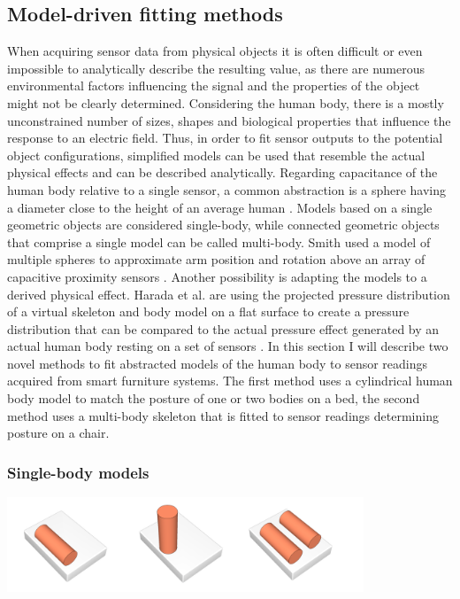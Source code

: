 \subsection{Model-driven fitting methods}
When acquiring sensor data from physical objects it is often difficult or even impossible to analytically describe the resulting value, as there are numerous environmental factors influencing the signal and the properties of the object might not be clearly determined. Considering the human body, there is a mostly unconstrained number of sizes, shapes and biological properties that influence the response to an electric field. Thus, in order to fit sensor outputs to the potential object configurations, simplified models can be used that resemble the actual physical effects and can be described analytically. Regarding capacitance of the human body relative to a single sensor, a common abstraction is a sphere having a diameter close to the height of an average human \cite{seaver1997human}. Models based on a single geometric objects are considered single-body, while connected geometric objects that comprise a single model can be called multi-body. Smith used a model of multiple spheres to approximate arm position and rotation above an array of capacitive proximity sensors \cite{smith1998electric}. Another possibility is adapting the models to a derived physical effect. Harada et al. are using the projected pressure distribution of a virtual skeleton and body model on a flat surface to create a pressure distribution that can be compared to the actual pressure effect generated by an actual human body resting on a set of sensors \cite{harada2000human}. In this section I will describe two novel methods to fit abstracted models of the human body to sensor readings acquired from smart furniture systems. The first method uses a cylindrical human body model to match the posture of one or two bodies on a bed, the second method uses a multi-body skeleton that is fitted to sensor readings determining posture on a chair.
\subsubsection{Single-body models}
\begin{minipage}{\linewidth}
\centering
\includegraphics[width=0.8\textwidth]{images/prot_model_bed}
\label{fig:prot_model_bed}
\end{minipage}	

